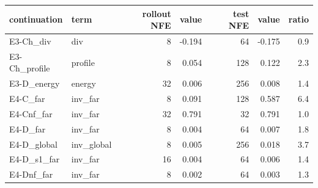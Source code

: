 \scriptsize
\setlength{\tabcolsep}{3pt}
\begin{tabular}{llrrrrr}
\toprule
continuation & term & rollout NFE & value & test NFE & value & ratio \\
\midrule
E3-Ch\_div & div & 8 & -0.194 & 64 & -0.175 & 0.9 \\
E3-Ch\_profile & profile & 8 & 0.054 & 128 & 0.122 & 2.3 \\
E3-D\_energy & energy & 32 & 0.006 & 256 & 0.008 & 1.4 \\
E4-C\_far & inv\_far & 8 & 0.091 & 128 & 0.587 & 6.4 \\
E4-Cnf\_far & inv\_far & 32 & 0.791 & 32 & 0.791 & 1.0 \\
E4-D\_far & inv\_far & 8 & 0.004 & 64 & 0.007 & 1.8 \\
E4-D\_global & inv\_global & 8 & 0.005 & 256 & 0.018 & 3.7 \\
E4-D\_s1\_far & inv\_far & 16 & 0.004 & 64 & 0.006 & 1.4 \\
E4-Dnf\_far & inv\_far & 8 & 0.002 & 64 & 0.003 & 1.3 \\
\bottomrule
\end{tabular}
